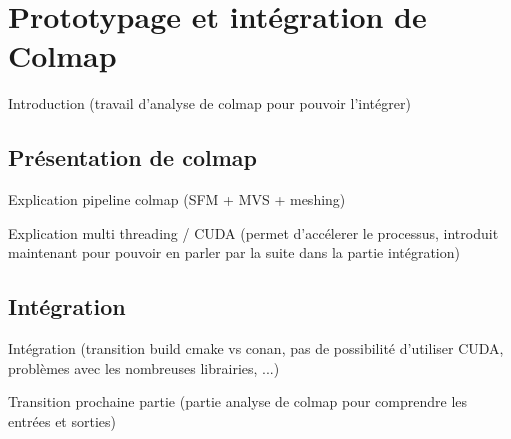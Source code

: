 \chapter{Prototypage et intégration de Colmap}

Introduction (travail d'analyse de colmap pour pouvoir l'intégrer)

\section{Présentation de colmap}

Explication pipeline colmap (SFM + MVS + meshing)




Explication multi threading / CUDA (permet d'accélerer le processus, introduit maintenant pour pouvoir en parler par la suite dans la partie intégration)

\section{Intégration}

Intégration (transition build cmake vs conan, pas de possibilité d'utiliser CUDA, problèmes avec les nombreuses librairies, ...)

Transition prochaine partie (partie analyse de colmap pour comprendre les entrées et sorties)


